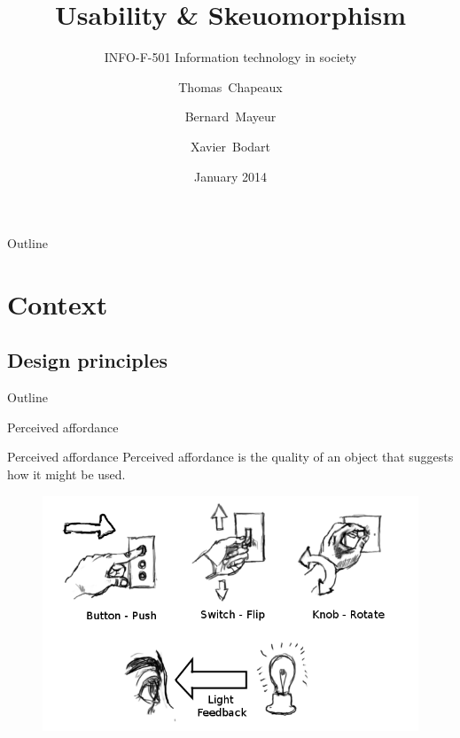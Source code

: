\documentclass{beamer}
\title {Usability \& Skeuomorphism}
\subtitle {INFO-F-501 Information technology in society}
\author{Thomas~Chapeaux  \and Bernard~Mayeur \and Xavier~Bodart }
\institute[shortinst]{Université Libre de Bruxelles \\ Belgium}
\date{January 2014}
\begin{document}
\maketitle{}

\begin{frame}{Outline}
    \tableofcontents
\end{frame}

\section{Context}

\subsection{Design principles}

\begin{frame}{Outline}
    \tableofcontents[currentsection]
\end{frame}



\begin{frame}{Perceived affordance}
	\begin{block}{Perceived affordance}
	Perceived affordance is the quality of an object that suggests how it might be used.
	\end{block}
	\begin{figure}[ht]
	\includegraphics[scale=0.3]{switches.png}
	\end{figure}
\end{frame}
\end{document}
